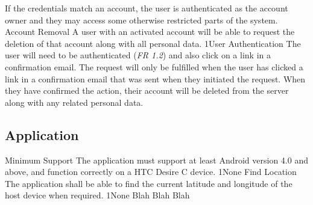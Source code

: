 			{If the credentials match an account, the user is authenticated as the account owner and they may access some otherwise restricted parts of the system.}
		\funcreq
			{Account Removal}
			{A user with an activated account will be able to request the deletion of that account along with all personal data.}
			{1}{User Authentication}
			{The user will need to be authenticated (\emph{FR 1.2}) and also click on a link in a confirmation email.}
			{The request will only be fulfilled when the user has clicked a link in a confirmation email that was sent when they initiated the request.}
			{When they have confirmed the action, their account will be deleted from the server along with any related personal data.}
	\subsection{Application}
		\nonfuncreq
			{Minimum Support}
			{The application must support at least Android version 4.0 and above, and function correctly on a HTC Desire C device.}
			{1}{None}
		\funcreq
			{Find Location}
			{The application shall be able to find the current latitude and longitude of the host device when required.}
			{1}{None}
			{Blah}
			{Blah}
			{Blah}
\renewcommand{\arraystretch}{1}
